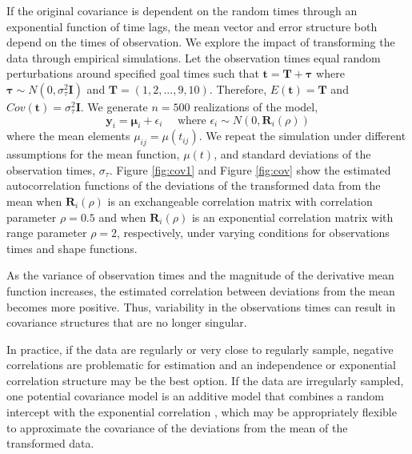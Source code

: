 \documentclass[12pt]{article}
\newcommand{\B}[0]{\mathbf}
\newcommand{\BS}[0]{\boldsymbol}
\begin{document}
If the original covariance is dependent on the random times through an exponential function of time lags, the mean vector and error structure both depend on the times of observation. We explore the impact of transforming the data through empirical simulations. Let the observation times equal random perturbations around specified goal times such that $\B t = \B T + \B \tau$ where $\B \tau\sim N(0,\sigma^{2}_{\tau}\B I)$ and $\B T = (1,2,...,9,10)$. Therefore, $E(\B t) = \B T$ and $Cov(\B t ) = \sigma^{2}_{\tau}\B I$. We generate $n=500$ realizations of the model,
$$\B y_{i} = \BS\mu_{i} + \epsilon_{i}\quad\text{ where }\epsilon_{i}\sim N(0,\B R_{i}(\rho))$$
where the mean elements $\mu_{ij}=\mu(t_{ij})$. We repeat the simulation under different assumptions for the mean function, $\mu(t)$, and standard deviations of the observation times, $\sigma_{\tau}$. Figure \ref{fig:cov1} and Figure \ref{fig:cov} show the estimated autocorrelation functions of the deviations of the transformed data from the mean when $\B R_{i}(\rho)$ is an exchangeable correlation matrix with correlation parameter $\rho=0.5$ and when  $\B R_{i}(\rho)$ is an exponential correlation matrix with range parameter $\rho=2$, respectively, under varying conditions for observations times and shape functions.

As the variance of observation times and the magnitude of the derivative mean function increases, the estimated correlation between deviations from the mean becomes more positive. Thus, variability in the observations times can result in covariance structures that are no longer singular. 

In practice, if the data are regularly or very close to regularly sample, negative correlations are problematic for estimation and an independence or exponential correlation structure may be the best option. If the data are irregularly sampled, one potential covariance model is an additive model that combines a random intercept with the exponential correlation \cite{diggle2002}, which may be appropriately flexible to approximate the covariance of the deviations from the mean of the transformed data.
\end{document}

